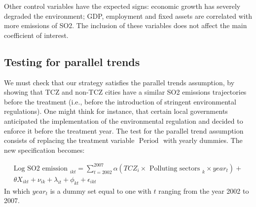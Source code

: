 \documentclass[12pt]{article}
\begin{document}
Other control variables have the expected signs: economic growth has severely degraded the environment; GDP, employment and fixed assets are correlated with more emissions of SO2. The inclusion of these variables does not affect the main coefficient of interest.

\subsection{Testing for parallel trends} \label{sec:parallel}

We must check that our strategy satisfies the parallel trends assumption, by showing that TCZ and non-TCZ cities have a similar SO2 emissions trajectories before the treatment (i.e., before the introduction of stringent environmental regulations). One might think for instance, that certain local governments anticipated the implementation of the environmental regulation and decided to enforce it before the treatment year. The test for the parallel trend assumption consists of replacing the treatment variable $\text { Period }$ with yearly dummies. The new specification becomes:

\begin{equation} \label{eq:paralleltrend}
\begin{aligned} 
\text {Log SO2 emission }_{i k t}=\sum_{t=2002}^{2007} \alpha (T C Z_{i}  \times \text {  Polluting sectors }_{k} \times year _{t}) + \\ 
\theta {X}_{i k t}+\nu_{ik}+\lambda_{it} +\phi_{kt} +\epsilon_{ikt} 
\end{aligned}
\end{equation}
In which $year_t$ is a dummy set equal to one with $t$ ranging from the year 2002 to 2007. 
\end{document}
